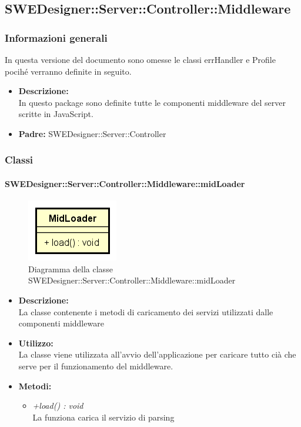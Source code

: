   \subsection{SWEDesigner::Server::Controller::Middleware}
    \subsubsection{Informazioni generali}
      In questa versione del documento sono omesse le classi errHandler e Profile pocihé verranno definite in seguito.
      \begin{itemize}
        \item \textbf{Descrizione: }\\
        In questo package sono definite tutte le componenti middleware del server scritte in JavaScript.
        \item \textbf{Padre: }SWEDesigner::Server::Controller
      \end{itemize}
    \subsubsection{Classi}
      \paragraph{SWEDesigner::Server::Controller::Middleware::midLoader}
      	\begin{figure}[h!]
		\centering
		\includegraphics[scale=0.8]{Classi/MidLoader.png}
		\caption{Diagramma della classe SWEDesigner::Server::Controller::Middleware::midLoader}
 		\end{figure}
        \begin{itemize}
          \item \textbf{Descrizione: }\\
          La classe contenente i metodi di caricamento dei servizi utilizzati dalle componenti middleware
          \item \textbf{Utilizzo: }\\
          La classe viene utilizzata all'avvio dell'applicazione per caricare tutto cià che serve per il funzionamento del middleware.
          \item \textbf{Metodi:}\\
          \begin{itemize}
            \item \emph{+load() : void}\\
            La funziona carica il servizio di parsing
          \end{itemize}
        \end{itemize}
